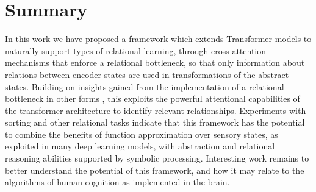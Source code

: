 \section{Summary}\label{sec:discuss}

In this work we have proposed a framework which extends Transformer models to 
naturally support types of relational learning, through cross-attention
mechanisms that enforce a relational bottleneck, so that only information about relations between encoder states
are used in transformations of the abstract states.
Building on insights gained from the implementation of a relational bottleneck in other forms \citep{esbn, kerg2022neural}, this exploits the powerful attentional capabilities of the transformer architecture to identify relevant relationships.
Experiments with sorting and other relational tasks indicate that this framework has the potential to combine the
benefits of function approximation over sensory states, as exploited in many deep learning models, with abstraction and relational reasoning abilities supported by symbolic processing.
Interesting
work remains to better understand the potential of this framework, and
how it may relate to the algorithms of human cognition as implemented in the brain.


